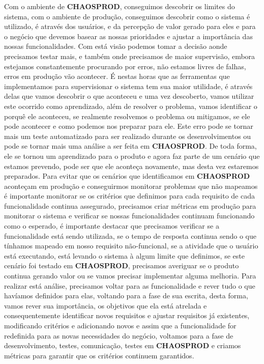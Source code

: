       Com o ambiente de \textbf{CHAOSPROD}, conseguimos descobrir os limites do
      sistema, com o ambiente de produção, conseguimos descobrir como o sistema é
      utilizado, é através dos usuários, e da percepção de valor gerado para eles
      e para o negócio que devemos basear as nossas prioridades e ajustar a
      importância das nossas funcionalidades. Com está visão podemos tomar a decisão
      aonde precisamos testar mais, e também onde precisamos de maior supervisão,
      embora estejamos constantemente procurando por erros, não estamos livres de
      falhas, erros em produção vão acontecer. É nestas horas que as ferramentas
      que implementamos para supervisionar o sistema tem sua maior utilidade, é
      através delas que vamos descobrir o que aconteceu e uma vez descoberto, vamos
      utilizar este ocorrido como aprendizado, além de resolver o problema, vamos
      identificar o porquê ele aconteceu, se realmente resolvemos o problema ou
      mitigamos, se ele pode acontecer e como podemos nos preparar para ele. Este
      erro pode se tornar mais um teste automatizado para ser realizado durante os
      desenvolvimentos ou pode se tornar mais uma análise a ser feita em
      \textbf{CHAOSPROD}. De toda forma, ele se tornou um aprendizado para o produto
      e agora faz parte de um cenário que estamos prevendo, pode ser que ele
      aconteça novamente, mas desta vez estaremos preparados. \newline
      Para evitar que os cenários que identificamos em \textbf{CHAOSPROD} aconteçam
      em produção e conseguirmos monitorar problemas que não mapeamos é importante
      monitorar se os critérios que definimos para cada requisito de cada funcionalidade
      continua assegurado, precisamos criar métricas em produção para monitorar
      o sistema e verificar se nossas funcionalidades continuam funcionando como o
      esperado, é importante destacar que precisamos verificar se a funcionalidade
      está sendo utilizada, se o tempo de resposta continua sendo o que tínhamos
      mapeado em nosso requisito não-funcional, se a atividade que o usuário está
      executando, está levando o sistema à algum limite que definimos, se este
      cenário foi testado em \textbf{CHAOSPROD}, precisamos averiguar se o
      produto continua gerando valor ou se vamos precisar implementar alguma
      melhoria. Para realizar está análise, precisamos voltar para as funcionalidade
      e rever tudo o que havíamos definidos para elas, voltando para a fase de
      sua escrita, desta forma, vamos rever sua importância, os objetivos que ela
      está atrelada e consequentemente identificar novos requisitos e ajustar
      requisitos já existentes, modificando critérios e adicionando novos e
      assim que a funcionalidade for redefinida para as novas necessidades do
      negócio, voltamos para a fase de desenvolvimento, testes, comunicação,
      testes em \textbf{CHAOSPROD} e criamos métricas para garantir que
      os critérios continuem garantidos.

